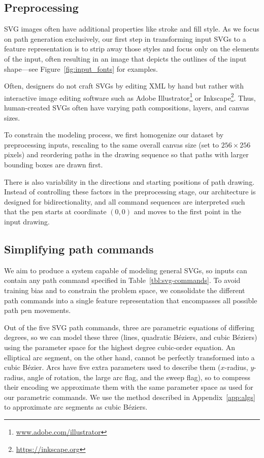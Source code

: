 \subsection{Preprocessing}
SVG images often have additional properties like stroke and fill style.
As we focus on path generation exclusively, our first step in transforming input SVGs to a feature representation is to strip away those styles and focus only on the  elements of the input, often resulting in an image that depicts the outlines of the input shape---see Figure~\ref{fig:input_fonts} for examples.

Often, designers do not craft SVGs by editing XML by hand but rather with interactive image editing software such as Adobe Illustrator\footnote{\url{www.adobe.com/illustrator}} or Inkscape\footnote{\url{https://inkscape.org}}.
Thus, human-created SVGs often have varying path compositions, layers, and canvas sizes.

To constrain the modeling process, we first homogenize our dataset by preprocessing inputs, rescaling to the same overall canvas size (set to $256\times 256$ pixels) and reordering paths in the drawing sequence so that paths with larger bounding boxes are drawn first.

There is also variability in the directions and starting positions of path drawing.
Instead of controlling these factors in the preprocessing stage, our architecture is designed for bidirectionality, and all command sequences are interpreted such that the pen starts at coordinate $(0, 0)$ and moves to the first point in the input drawing.

\subsection{Simplifying path commands}
We aim to produce a system capable of modeling general SVGs, so inputs can contain any path command specified in Table~\ref{tbl:svg-commands}.
To avoid training bias and to constrain the problem space, we consolidate the different path commands into a single feature representation that encompasses all possible path pen movements.

Out of the five SVG path commands, three are parametric equations of differing degrees, so we can model these three (lines, quadratic B\'eziers, and cubic B\'eziers) using the parameter space for the highest degree cubic-order equation.
An elliptical arc segment, on the other hand, cannot be perfectly transformed into a cubic B\'ezier.
Arcs have five extra parameters used to describe them ($x$-radius, $y$-radius, angle of rotation, the large arc flag, and the sweep flag), so to compress their encoding we approximate them with the same parameter space as used for our parametric commands.
We use the method described in Appendix~\ref{app:algs} to approximate arc segments as cubic B\'eziers.

